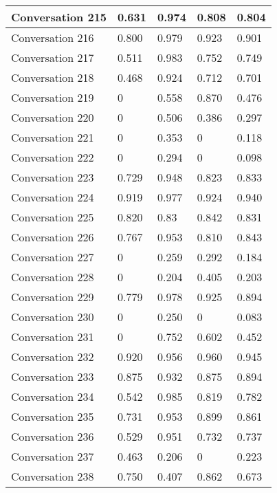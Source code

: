 \begin{table}[]
\begin{tabular}{|l|l|l|l|l|}
Conversation 215 & 0.631    & 0.974 & 0.808       & 0.804   \\ \hline
Conversation 216 & 0.800    & 0.979 & 0.923       & 0.901   \\ \hline
Conversation 217 & 0.511    & 0.983 & 0.752       & 0.749   \\ \hline
Conversation 218 & 0.468    & 0.924 & 0.712       & 0.701   \\ \hline
Conversation 219 & 0        & 0.558 & 0.870       & 0.476   \\ \hline
Conversation 220 & 0        & 0.506 & 0.386       & 0.297   \\ \hline
Conversation 221 & 0        & 0.353 & 0           & 0.118   \\ \hline
Conversation 222 & 0        & 0.294 & 0           & 0.098   \\ \hline
Conversation 223 & 0.729    & 0.948 & 0.823       & 0.833   \\ \hline
Conversation 224 & 0.919    & 0.977 & 0.924       & 0.940   \\ \hline
Conversation 225 & 0.820    & 0.83  & 0.842       & 0.831   \\ \hline
Conversation 226 & 0.767    & 0.953 & 0.810       & 0.843   \\ \hline
Conversation 227 & 0        & 0.259 & 0.292       & 0.184   \\ \hline
Conversation 228 & 0        & 0.204 & 0.405       & 0.203   \\ \hline
Conversation 229 & 0.779    & 0.978 & 0.925       & 0.894   \\ \hline
Conversation 230 & 0        & 0.250 & 0           & 0.083   \\ \hline
Conversation 231 & 0        & 0.752 & 0.602       & 0.452   \\ \hline
Conversation 232 & 0.920    & 0.956 & 0.960       & 0.945   \\ \hline
Conversation 233 & 0.875    & 0.932 & 0.875       & 0.894   \\ \hline
Conversation 234 & 0.542    & 0.985 & 0.819       & 0.782   \\ \hline
Conversation 235 & 0.731    & 0.953 & 0.899       & 0.861   \\ \hline
Conversation 236 & 0.529    & 0.951 & 0.732       & 0.737   \\ \hline
Conversation 237 & 0.463    & 0.206 & 0           & 0.223   \\ \hline
Conversation 238 & 0.750    & 0.407 & 0.862       & 0.673   \\ \hline

\end{tabular}
\end{table}
